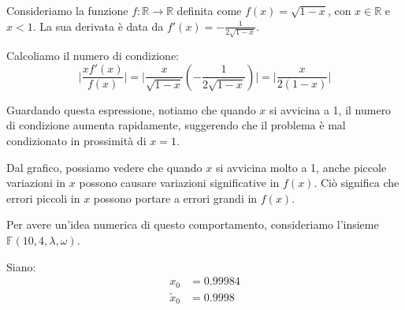 \documentclass{article}
\begin{document}
\begin{example}
    Consideriamo la funzione $f:\mathbb{R}\rightarrow \mathbb{R}$ definita
    come $f(x)=\sqrt{1-x}$, con $x\in \mathbb{R}$ e $x<1$. 
    La sua derivata è data da $f'(x)=-\frac{1}{2\sqrt{1-x}}$.

    Calcoliamo il numero di condizione: 
    $$\Big\lvert
   \frac{xf'(x)}{f(x)}\Big\rvert=\Big\lvert\frac{x}{\sqrt{1-x}}(-\frac{1}{2\sqrt{1-x}})\Big\rvert=\Big\lvert
\frac{x}{2(1-x)}\Big\rvert$$

Guardando questa espressione, notiamo che quando $x$ si avvicina a 1, il
numero di condizione aumenta rapidamente, suggerendo che il problema è mal
condizionato in prossimità di $x=1$. 

\begin{center}
\end{center}

Dal grafico, possiamo vedere che quando $x$ si avvicina molto a 1, anche
piccole variazioni in $x$ possono causare variazioni significative in $f(x)$.
Ciò significa che errori piccoli in $x$ possono portare a errori grandi in
$f(x)$.

Per avere un'idea numerica di questo comportamento, consideriamo l'insieme
$\mathbb{F}(10,4,\lambda,\omega)$.

Siano:
\begin{equation*}
    \begin{aligned}
        x_0 &= 0.99984 \\
        \tilde{x}_0 &= 0.9998
    \end{aligned}
\end{equation*}


\end{example}
\end{document}
